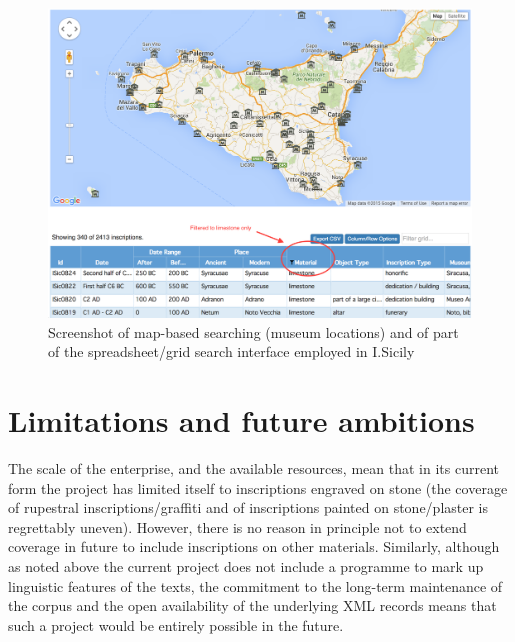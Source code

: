 \documentclass[amsthm,ebook]{saparticle}
\begin{document}
\begin{figure}[!bp]
\centering
 \includegraphics[width=\columnwidth]{EAGLE2016ISicilyfinalcopy-img002.png}
\caption{Screenshot of map-based searching (museum locations) and of part of the spreadsheet/grid search interface
employed in I.Sicily}
\label{fig:2}
\end{figure}
 



\section{Limitations and future ambitions}


\noindent The scale of the enterprise, and the available resources, mean that in its current form the project has limited itself
to inscriptions engraved on stone (the coverage of rupestral inscriptions/graffiti and of inscriptions painted on
stone/plaster is regrettably uneven). However, there is no reason in principle not to extend coverage in future to
include inscriptions on other materials. Similarly, although as noted above the current project does not include a
programme to mark up linguistic features of the texts, the commitment to the long-term maintenance of the corpus and
the open availability of the underlying XML records means that such a project would be entirely possible in the future.
\end{document}
